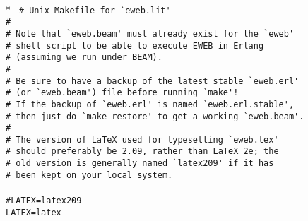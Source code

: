 \begin{flushleft}
\label{Makefile_start}
\\*
\tt
\noindent{}%
\verb&# Unix-Makefile for `eweb.lit'&\\
\noindent{}%
\verb&#&\\
\noindent{}%
\verb&# Note that `eweb.beam' must already exist for the `eweb'&\\
\noindent{}%
\verb&# shell script to be able to execute EWEB in Erlang&\\
\noindent{}%
\verb&# (assuming we run under BEAM).&\\
\noindent{}%
\verb&#&\\
\noindent{}%
\verb&# Be sure to have a backup of the latest stable `eweb.erl'&\\
\noindent{}%
\verb&# (or `eweb.beam') file before running `make'!&\\
\noindent{}%
\verb&# If the backup of `eweb.erl' is named `eweb.erl.stable',&\\
\noindent{}%
\verb&# then just do `make restore' to get a working `eweb.beam'.&\\
\noindent{}%
\verb&#&\\
\noindent{}%
\verb&# The version of LaTeX used for typesetting `eweb.tex'&\\
\noindent{}%
\verb&# should preferably be 2.09, rather than LaTeX 2e; the&\\
\noindent{}%
\verb&# old version is generally named `latex209' if it has&\\
\noindent{}%
\verb&# been kept on your local system.&\\
\noindent{}%
\verb&&\\
\noindent{}%
\verb&#LATEX=latex209&\\
\noindent{}%
\verb&LATEX=latex&\\

\end{flushleft}
